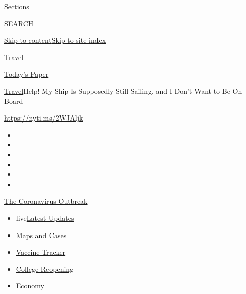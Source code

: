 Sections

SEARCH

\protect\hyperlink{site-content}{Skip to
content}\protect\hyperlink{site-index}{Skip to site index}

\href{https://www.nytimes.com/section/travel}{Travel}

\href{https://myaccount.nytimes.com/auth/login?response_type=cookie\&client_id=vi}{}

\href{https://www.nytimes.com/section/todayspaper}{Today's Paper}

\href{/section/travel}{Travel}\textbar{}Help! My Ship Is Supposedly
Still Sailing, and I Don't Want to Be On Board

\url{https://nyti.ms/2WJAljk}

\begin{itemize}
\item
\item
\item
\item
\item
\item
\end{itemize}

\href{https://www.nytimes.com/news-event/coronavirus?action=click\&pgtype=Article\&state=default\&region=TOP_BANNER\&context=storylines_menu}{The
Coronavirus Outbreak}

\begin{itemize}
\tightlist
\item
  live\href{https://www.nytimes.com/2020/08/04/world/coronavirus-cases.html?action=click\&pgtype=Article\&state=default\&region=TOP_BANNER\&context=storylines_menu}{Latest
  Updates}
\item
  \href{https://www.nytimes.com/interactive/2020/us/coronavirus-us-cases.html?action=click\&pgtype=Article\&state=default\&region=TOP_BANNER\&context=storylines_menu}{Maps
  and Cases}
\item
  \href{https://www.nytimes.com/interactive/2020/science/coronavirus-vaccine-tracker.html?action=click\&pgtype=Article\&state=default\&region=TOP_BANNER\&context=storylines_menu}{Vaccine
  Tracker}
\item
  \href{https://www.nytimes.com/2020/08/02/us/covid-college-reopening.html?action=click\&pgtype=Article\&state=default\&region=TOP_BANNER\&context=storylines_menu}{College
  Reopening}
\item
  \href{https://www.nytimes.com/live/2020/08/04/business/stock-market-today-coronavirus?action=click\&pgtype=Article\&state=default\&region=TOP_BANNER\&context=storylines_menu}{Economy}
\end{itemize}

